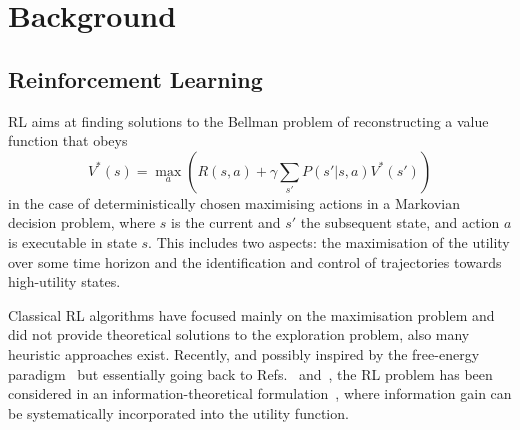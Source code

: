 \documentclass{article}
\begin{document}

\section{Background}\label{background}

\subsection{Reinforcement Learning}

RL aims at finding solutions to the Bellman problem of reconstructing a value function that obeys
\begin{equation}
	V^*(s)=\max_a \left(R(s,a) + \gamma \sum_{s'} P(s'|s,a) V^*(s')\right)
\end{equation} 
in the case of deterministically chosen maximising actions in a Markovian decision problem, where
$s$ is the current and $s'$ the subsequent state, and action $a$ is executable in state $s$.
This includes two aspects: the maximisation of the utility over some time horizon and the 
identification and control of trajectories towards high-utility states. 

Classical RL algorithms
have focused mainly on the maximisation problem and did not provide theoretical 
solutions to the exploration problem, also many heuristic approaches exist.
Recently, and possibly inspired by the free-energy paradigm~\cite{friston2006free}
but essentially going back to Refs.~\cite{still2012information} and~\cite{bialek1999predictive}, 
the RL problem has been considered in an information-theoretical 
formulation~\cite{tschantz2020reinforcement}, 
where information gain can be  systematically incorporated into the utility function.
\end{document}
